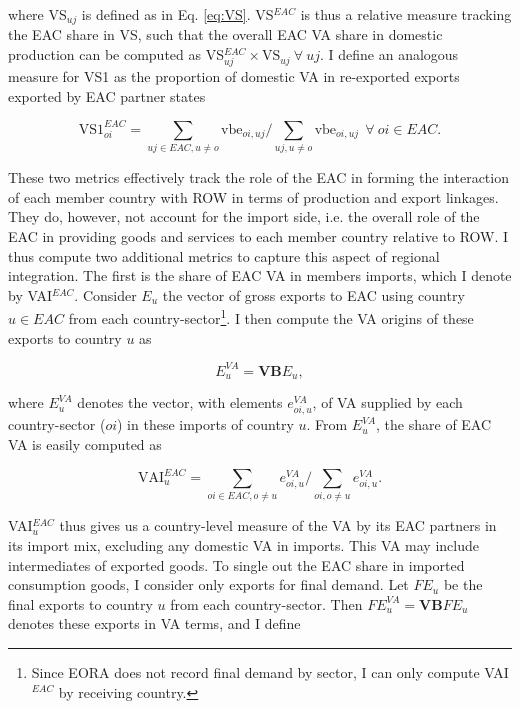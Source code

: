 \documentclass[a4paper]{article}
\begin{document}
\noindent where VS$_{uj}$ is defined as in Eq. \ref{eq:VS}. VS$^{EAC}$ is thus a relative measure tracking the EAC share in VS, such that the overall EAC VA share in domestic production can be computed as VS$_{uj}^{EAC} \times \text{VS}_{uj} \ \forall\ uj$. I define an analogous measure for VS1 as the proportion of domestic VA in re-exported exports exported by EAC partner states 

\begin{equation} \label{eq:VS1_EAC}
\text{VS1}_{oi}^{EAC} =  \sum_{uj \in EAC, u \neq  o} \text{vbe}_{oi, uj} \bigg/ \sum_{uj, u \neq  o} \text{vbe}_{oi, uj}\ \ \forall\ oi \in EAC.
\end{equation}

These two metrics effectively track the role of the EAC in forming the interaction of each member country with ROW in terms of production and export linkages. They do, however, not account for the import side, i.e. the overall role of the EAC in providing goods and services to each member country relative to ROW. I thus compute two additional metrics to capture this aspect of regional integration. The first is the share of EAC VA in members imports, which I denote by VAI$^{EAC}$. Consider $E_u$ the vector of gross exports to EAC using country $u \in EAC$ from each country-sector\footnote{Since EORA does not record final demand by sector, I can only compute VAI$^{EAC}$ by receiving country.}. I then compute the VA origins of these exports to country $u$ as 

\begin{equation}
E_u^{VA} = \textbf{VB}E_u,
\end{equation}

\noindent where $E_u^{VA}$ denotes the vector, with elements $e_{oi, u}^{VA}$, of VA supplied by each country-sector ($oi$) in these imports of country $u$. From  $E_u^{VA}$, the share of EAC VA is easily computed as 

\begin{equation}
\text{VAI}_u^{EAC} = \sum_{oi \in EAC, o \neq u}  e_{oi, u}^{VA}  \bigg/ \sum_{oi, o \neq u}  e_{oi, u}^{VA}.  
\end{equation}

VAI$_u^{EAC}$ thus gives us a country-level measure of the VA by its EAC partners in its import mix, excluding any domestic VA in imports. This VA may include intermediates of exported goods. To single out the EAC share in imported consumption goods, I consider only exports for final demand. Let $FE_u$ be the final exports to country $u$ from each country-sector. Then $FE_u^{VA} = \textbf{VB}FE_u$ denotes these exports in VA terms, and I define
\end{document}
